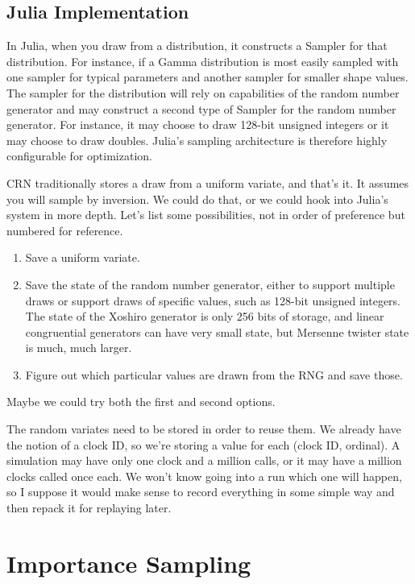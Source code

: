 \documentclass{article}
\begin{document}
\subsection{Julia Implementation}

In Julia, when you draw from a distribution, it constructs a Sampler for that distribution. For instance, if a Gamma distribution is most easily sampled with one sampler for typical parameters and another sampler for smaller shape values. The sampler for the distribution will rely on capabilities of the random number generator and may construct a second type of Sampler for the random number generator. For instance, it may choose to draw 128-bit unsigned integers or it may choose to draw doubles. Julia's sampling architecture is therefore highly configurable for optimization.

CRN traditionally stores a draw from a uniform variate, and that's it. It assumes you will sample by inversion. We could do that, or we could hook into Julia's system in more depth. Let's list some possibilities, not in order of preference but numbered for reference.
\begin{enumerate}
	\item Save a uniform variate.
	\item Save the state of the random number generator, either to support multiple draws or support draws of specific values, such as 128-bit unsigned integers. The state of the Xoshiro generator is only 256 bits of storage, and linear congruential generators can have very small state, but Mersenne twister state is much, much larger.
	\item Figure out which particular values are drawn from the RNG and save those.
\end{enumerate}
Maybe we could try both the first and second options.

The random variates need to be stored in order to reuse them. We already have the notion of a clock ID, so we're storing a value for each (clock ID, ordinal). A simulation may have only one clock and a million calls, or it may have a million clocks called once each. We won't know going into a run which one will happen, so I suppose it would make sense to record everything in some simple way and then repack it for replaying later.


\section{Importance Sampling}
\end{document}
